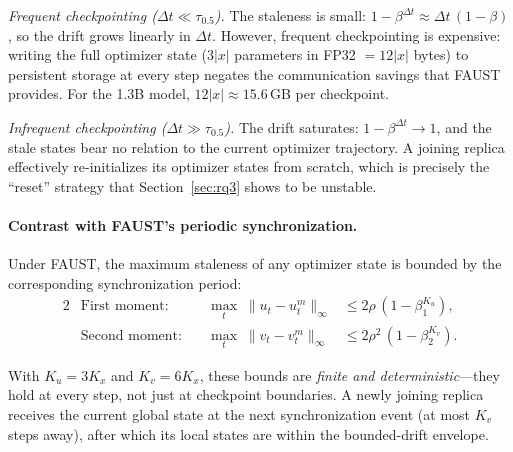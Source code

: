 \documentclass{article}
\begin{document}
\medskip
\noindent\emph{Frequent checkpointing ($\Delta t \ll \tau_{0.5}$).}
The staleness is small: $1 - \beta^{\Delta t} \approx \Delta t\,(1-\beta)$,
so the drift grows linearly in $\Delta t$. However, frequent checkpointing
is expensive: writing the full optimizer state ($3|x|$ parameters in
FP32 $= 12|x|$ bytes) to persistent storage at every step negates the
communication savings that FAUST provides. For the 1.3B model,
$12|x| \approx 15.6$\,GB per checkpoint.

\medskip
\noindent\emph{Infrequent checkpointing ($\Delta t \gg \tau_{0.5}$).}
The drift saturates: $1 - \beta^{\Delta t} \to 1$, and the stale states
bear no relation to the current optimizer trajectory. A joining replica
effectively re-initializes its optimizer states from scratch, which is
precisely the ``reset'' strategy that
Section~\ref{sec:rq3} shows to be unstable.

\paragraph{Contrast with FAUST's periodic synchronization.}
Under FAUST, the maximum staleness of any optimizer state is bounded
by the corresponding synchronization period:
\begin{alignat}{2}
&\text{First moment:}\quad&
\max_t\;\|u_t - u_t^m\|_\infty
&\leq 2\rho\,(1 - \beta_1^{K_u}),
\label{eq:ckpt_nsp_u} \\[4pt]
&\text{Second moment:}\quad&
\max_t\;\|v_t - v_t^m\|_\infty
&\leq 2\rho^2\,(1 - \beta_2^{K_v}).
\label{eq:ckpt_nsp_v}
\end{alignat}

With $K_u = 3K_x$ and $K_v = 6K_x$, these bounds are \emph{finite and
deterministic}---they hold at every step, not just at checkpoint
boundaries. A newly joining replica receives the current global state at
the next synchronization event (at most $K_v$ steps away), after which
its local states are within the bounded-drift envelope.
\end{document}
